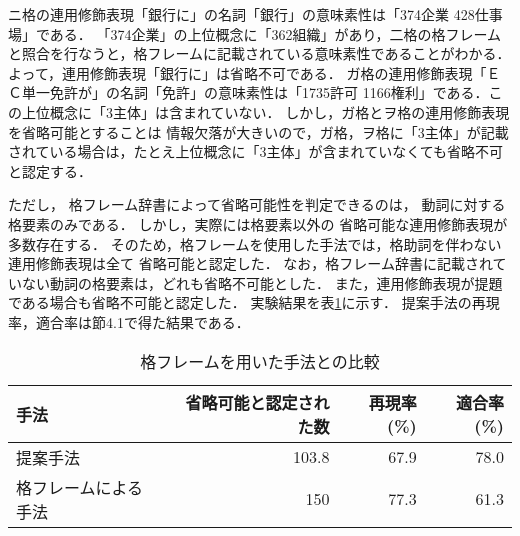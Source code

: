 \begin{description}
\begin{table}[bt]
\begin{center}
\begin{tabular}{r|l|l}
\hline
\end{tabular}
\end{center}
\end{table}
ニ格の連用修飾表現「銀行に」の名詞「銀行」の意味素性は「374企業 428仕事場」である．
「374企業」の上位概念に「362組織」があり，二格の格フレームと照合を行なうと，格フレームに記載されている意味素性であることがわかる．
よって，連用修飾表現「銀行に」は省略不可である．
ガ格の連用修飾表現「ＥＣ単一免許が」の名詞「免許」の意味素性は「1735許可 1166権利」である．この上位概念に「3主体」は含まれていない．
しかし，ガ格とヲ格の連用修飾表現を省略可能とすることは
情報欠落が大きいので，ガ格，ヲ格に「3主体」が記載されている場合は，たとえ上位概念に「3主体」が含まれていなくても省略不可と認定する．
\end{description}
ただし，
格フレーム辞書によって省略可能性を判定できるのは，
動詞に対する格要素のみである．
しかし，実際には格要素以外の
省略可能な連用修飾表現が多数存在する．
そのため，格フレームを使用した手法では，格助詞を伴わない連用修飾表現は全て
省略可能と認定した．
なお，格フレーム辞書に記載されていない動詞の格要素は，どれも省略不可能とした．
また，連用修飾表現が提題である場合も省略不可能と認定した．
実験結果を表\ref{Experiment_Resul2}に示す．
提案手法の再現率，適合率は節4.1で得た結果である．
\begin{table}[bt]
\begin{center}
\caption{格フレームを用いた手法との比較} \label{Experiment_Resul2}
\begin{tabular}{l|r|r|r}
\hline
手法 & 省略可能と認定された数 & 再現率(\%) & 適合率(\%) \\ \hline \hline
提案手法 & 103.8 & 67.9 & 78.0 \\
格フレームによる手法 & 150 & 77.3 & 61.3 \\
\hline
\end{tabular}
\end{center}
\end{table}
